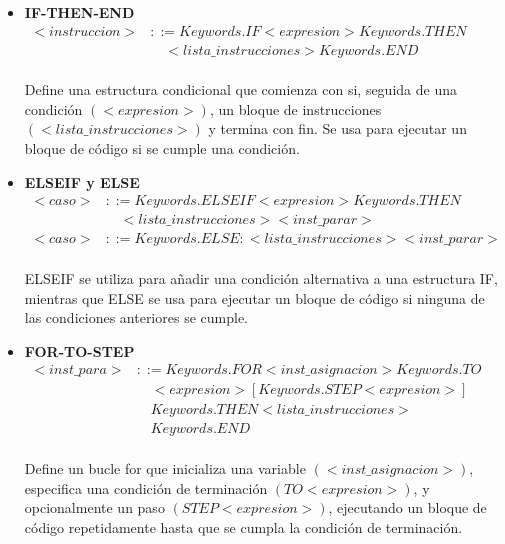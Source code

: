 \begin{itemize}
  \item \textbf{IF-THEN-END} \\
  \begin{math}
    \begin{array}{rl}
      <instruccion> & ::= Keywords.IF <expresion> Keywords.THEN \\ 
        & \quad <lista\_instrucciones> Keywords.END
    \end{array}
  \end{math} \\\\
  Define una estructura condicional que comienza con si, seguida de una condición $(<expresion>)$, un bloque de instrucciones $(<lista\_instrucciones>)$ y termina con fin. Se usa para ejecutar un bloque de código si se cumple una condición.
  \item \textbf{ELSEIF y ELSE} \\
  \begin{math}
    \begin{array}{rl}
      <caso> & ::= Keywords.ELSEIF <expresion> Keywords.THEN \\
        & \quad <lista\_instrucciones> <inst\_parar> \\
      <caso> & ::= Keywords.ELSE : <lista\_instrucciones> <inst\_parar>
    \end{array}
  \end{math} \\\\
  ELSEIF se utiliza para añadir una condición alternativa a una estructura IF, mientras que ELSE se usa para ejecutar un bloque de código si ninguna de las condiciones anteriores se cumple.
  \item \textbf{FOR-TO-STEP} \\
  \begin{math}
    \begin{array}{rl}
      <inst\_para> & ::= Keywords.FOR <inst\_asignacion> Keywords.TO \\
        & \quad <expresion> [Keywords.STEP <expresion>] \\ 
        & \quad Keywords.THEN <lista\_instrucciones> \\
        & \quad Keywords.END
    \end{array}
  \end{math} \\\\
  Define un bucle for que inicializa una variable $(<inst\_asignacion>)$, especifica una condición de terminación $(TO <expresion>)$, y opcionalmente un paso $(STEP <expresion>)$, ejecutando un bloque de código repetidamente hasta que se cumpla la condición de terminación.

\end{itemize}
